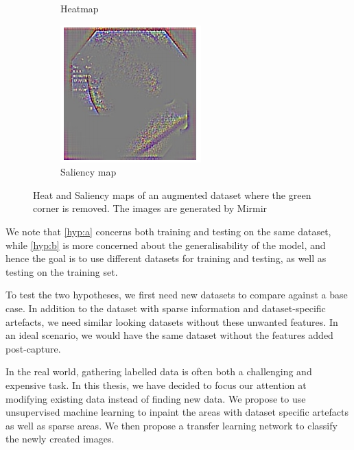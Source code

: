 \begin{figure}[t]
\begin{subfigure}[t]{0.3\textwidth}
         \caption{Heatmap}
         \label{fig:sal5}
     \end{subfigure}     
     \hfill
     \begin{subfigure}[t]{0.3\textwidth}
         \centering
         \includegraphics[width=\textwidth]{methodology/figures/sal7.png}
         \caption{Saliency map}
         \label{fig:sal7}
     \end{subfigure}
     \caption{Heat and Saliency maps of an augmented dataset where the green corner is removed. The images are generated by Mirmir}
     \label{fig:Saliencymasks2}
\end{figure}



We note that \ref{hyp:a} concerns both training and testing on the same dataset, while \ref{hyp:b} is more concerned about the generalisability of the model, and hence the goal is to use different datasets for training and testing, as well as testing on the training set. 


To test the two hypotheses, we first need new datasets to compare against a base case. In addition to the dataset with sparse information and dataset-specific artefacts, we need similar looking datasets without these unwanted features. In an ideal scenario, we would have the same dataset without the features added post-capture. 

In the real world, gathering labelled data is often both a challenging and expensive task. In this thesis, we have decided to focus our attention at modifying existing data instead of finding new data. 
We propose to use unsupervised machine learning to inpaint the areas with dataset specific artefacts as well as sparse areas. We then propose a transfer learning network to classify the newly created images. 


